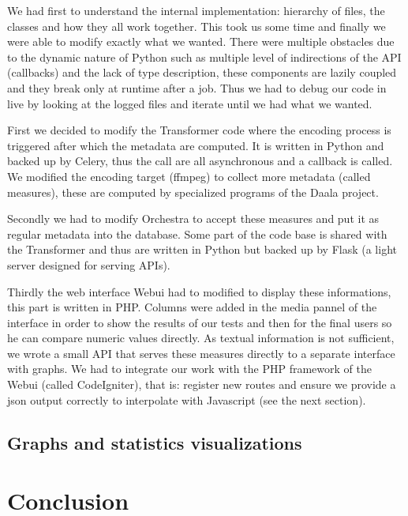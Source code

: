 \documentclass[a4paper,12pt]{article}
\begin{document}
We had first to understand the internal implementation: hierarchy of files, the classes and how they all work together.
This took us some time and finally we were able to modify exactly what we wanted.
There were multiple obstacles due to the dynamic nature of Python such as multiple level of indirections of the API (callbacks) and the lack of type description, these components are lazily coupled and they break only at runtime after a job.
Thus we had to debug our code in live by looking at the logged files and iterate until we had what we wanted.

First we decided to modify the Transformer code where the encoding process is triggered after which the metadata are computed.
It is written in Python and backed up by Celery, thus the call are all asynchronous and a callback is called.
We modified the encoding target (ffmpeg) to collect more metadata (called measures), these are computed by specialized programs of the Daala project.

Secondly we had to modify Orchestra to accept these measures and put it as regular metadata into the database. Some part of the code base is shared with the Transformer and thus are written in Python but backed up by Flask (a light server designed for serving APIs).

Thirdly the web interface Webui had to modified to display these informations, this part is written in PHP.
Columns were added in the media pannel of the interface in order to show the results of our tests and then for the final users so he can compare numeric values directly.
As textual information is not sufficient, we wrote a small API that serves these measures directly to a separate interface with graphs.
We had to integrate our work with the PHP framework of the Webui (called CodeIgniter), that is: register new routes and ensure we provide a json output correctly to interpolate with Javascript (see the next section).

\subsection{Graphs and statistics visualizations}

\section{Conclusion}
\end{document}
